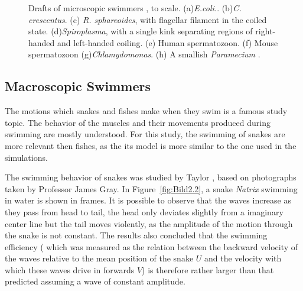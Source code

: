 \begin{figure}[H]
\centering
  \begin{footnotesize}
  
  \caption[Drafts of microscopic swimmers , to scale. (a)\textit{E.coli.}. (b)\textit{C. crescentus}. (c) \textit{R. sphareoides}, with flagellar filament in the coiled
   state. (d)\textit{Spiroplasma}, with a single kink separating regions of right-handed and left-handed coiling. (e) Human spermatozoon. (f) Mouse spermatozoon (g)\textit{Chlamydomonas}.
   (h) A smallish \textit{Paramecium} \cite{lauga_hydrodynamics_2009}.]{Drafts of microscopic swimmers , to scale. (a)\textit{E.coli.}. (b)\textit{C. crescentus}. (c) \textit{R. sphareoides}, with flagellar filament in the coiled
   state. (d)\textit{Spiroplasma}, with a single kink separating regions of right-handed and left-handed coiling. (e) Human spermatozoon. (f) Mouse spermatozoon (g)\textit{Chlamydomonas}.
   (h) A smallish \textit{Paramecium} \cite{lauga_hydrodynamics_2009}.}
  \label{fig:Bild2.1}
  \end{footnotesize}
\end{figure} 

\subsection{Macroscopic Swimmers}
\label{sec:section 1}


The motions which snakes and fishes make when they swim is a famous study topic\cite{taylor_analysis_1952}. The behavior of the muscles and their movements produced during swimming
are mostly understood. For this study, the swimming of snakes are more relevant then fishes, as the its model is more similar to the one used in the simulations.\par

The swimming behavior of snakes was studied by Taylor \cite{taylor_analysis_1952}, based on photographs taken by Professor James Gray. In Figure~\ref{fig:Bild2.2}, a snake \textit{Natrix} swimming in water is shown in
frames. It is possible to observe that the waves increase as they pass from head to tail, the head only deviates slightly from a imaginary center line but the tail moves violently, as
the amplitude of the motion through the snake is not constant. The results also concluded that the swimming efficiency ( which was measured as the relation between the backward
velocity of the waves relative to the mean position of the snake $U$ and the velocity with which these waves drive in forwards $V$) is therefore rather larger than that predicted
assuming a wave of constant amplitude.\par

